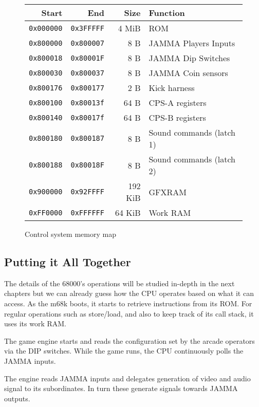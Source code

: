 \begin{figure}[H]
{
\begin{tabularx}{\textwidth}{rrrX}
  \textbf{Start } & \textbf{End  } & \textbf{Size } & \textbf{Function } \\               
  \toprule    
  \texttt{0x000000} & \texttt{0x3FFFFF} & 4 MiB & ROM \\
  \toprule    
  \texttt{0x800000} & \texttt{0x800007} & 8 B & JAMMA Players Inputs \\
  \texttt{0x800018} & \texttt{0x80001F} & 8 B & JAMMA Dip Switches \\
  \texttt{0x800030} & \texttt{0x800037} & 8 B & JAMMA Coin sensors \\
  \texttt{0x800176} & \texttt{0x800177} & 2 B & Kick harness \\
\toprule    
  \texttt{0x800100} & \texttt{0x80013f} & 64 B & CPS-A registers\\
  \texttt{0x800140} & \texttt{0x80017f} & 64 B & CPS-B registers\\
\toprule    
  \texttt{0x800180} & \texttt{0x800187} & 8 B & Sound commands (latch 1)\\
  \texttt{0x800188} & \texttt{0x80018F} & 8 B & Sound commands (latch 2)\\
  \toprule    
  \texttt{0x900000} & \texttt{0x92FFFF} & 192 KiB & GFXRAM\\
  \texttt{0xFF0000} & \texttt{0xFFFFFF} & 64 KiB & Work RAM \\
\end{tabularx}%
}\caption*{Control system memory map}
\end{figure} \label{m68k_mm}

\subsection{Putting it All Together}

The details of the 68000's operations will be studied in-depth in the next chapters but we can already guess how the CPU operates based on what it can access. As the m68k boots, it starts to retrieve instructions from its ROM. For regular operations such as store/load, and also to keep track of its call stack, it uses its work RAM. 

The game engine starts and reads the configuration set by the arcade operators via the DIP switches. While the game runs, the CPU continuously polls the JAMMA inputs.

The engine reads JAMMA inputs and delegates generation of video and audio signal to its subordinates. In turn these generate signals towards JAMMA outputs.

